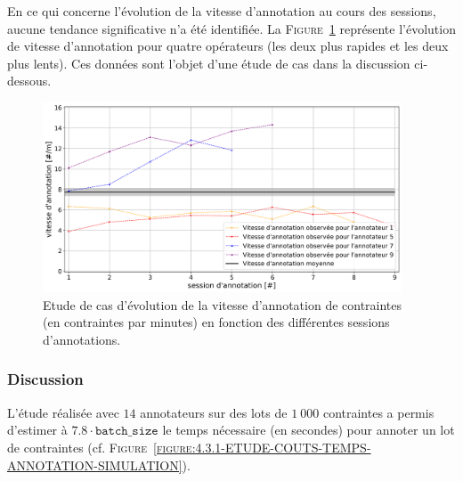 			En ce qui concerne l'évolution de la vitesse d'annotation au cours des sessions, aucune tendance significative n'a été identifiée. 
			La \textsc{Figure~\ref{figure:4.3.1-ETUDE-COUTS-TEMPS-ANNOTATION-EXEMPLE}} représente l'évolution de vitesse d'annotation pour quatre opérateurs (les deux plus rapides et les deux plus lents).
			Ces données sont l'objet d'une étude de cas dans la discussion ci-dessous.
			\begin{figure}[!htb]
				\centering
				\includegraphics[width=0.95\textwidth]{figures/etude-temps-annotation-3-etude-de-cas}
				\caption{
					Etude de cas d'évolution de la vitesse d'annotation de contraintes (en contraintes par minutes) en fonction des différentes sessions d'annotations.
				}
				\label{figure:4.3.1-ETUDE-COUTS-TEMPS-ANNOTATION-EXEMPLE}
			\end{figure}

		\subsubsection{Discussion}

		
		L'étude réalisée avec $14$ annotateurs sur des lots de $1~000$ contraintes a permis d'estimer à $7.8 \cdot \texttt{batch\_size}$ le temps nécessaire (en secondes) pour annoter un lot de contraintes (cf. \textsc{Figure~\ref{figure:4.3.1-ETUDE-COUTS-TEMPS-ANNOTATION-SIMULATION}}).
		
